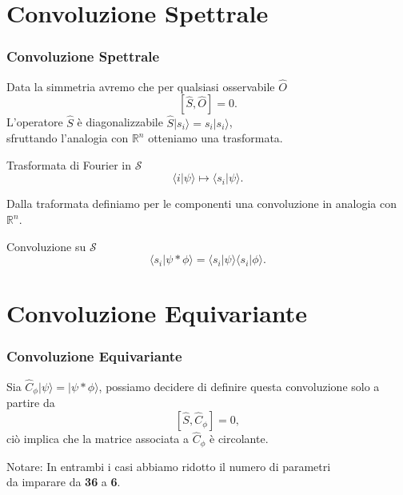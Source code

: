\documentclass[xcolor=dvipsnames]{beamer}
\newcommand{\R}{\mathbb{R}}
\newcommand{\mc}[1]{\mathcal{#1}}
\begin{document}
\section{Convoluzione Spettrale}

\begin{frame}
    \frametitle{Convoluzione Spettrale}
    Data la simmetria avremo che per qualsiasi osservabile $\widehat{O}$
    \[ [\widehat{S}, \widehat{O}] = 0 . \]
    L'operatore $\widehat{S}$ è diagonalizzabile $\widehat{S} |s_i \rangle = s_i | s_i \rangle$,\\ sfruttando l'analogia con $\R^n$ otteniamo una trasformata.
    \begin{block}{Trasformata di Fourier in $\mc{S}$}
        \[ \langle i | \psi \rangle \mapsto \langle s_i | \psi \rangle. \]
    \end{block}
    Dalla traformata definiamo per le componenti una convoluzione in analogia con $\R^n$.
    \begin{block}{Convoluzione su $\mc{S}$}
        \[ \langle s_i | \psi * \phi \rangle = \langle s_i | \psi \rangle \langle s_i | \phi \rangle . \]
    \end{block}   
\end{frame}

\section{Convoluzione Equivariante}

\begin{frame}
    \frametitle{Convoluzione Equivariante}
    Sia $\widehat{C}_\phi | \psi \rangle = | \psi * \phi \rangle$, possiamo decidere di definire questa convoluzione solo a partire da
    \[ [\widehat{S}, \widehat{C}_\phi] = 0, \]
    ciò implica che la matrice associata a $\widehat{C}_\phi$ è circolante.

    \begin{block}{Notare:}
        In entrambi i casi abbiamo ridotto il numero di parametri \\ da imparare da \textbf{36} a \textbf{6}.
    \end{block}
\end{frame}
\end{document}
